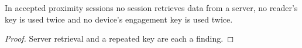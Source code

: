\begin{theorem}
  \label{thm:proximity-sessions}
  In accepted proximity sessions no session retrieves data from a server, no
  reader's key is used twice and no device's engagement key is used twice.
\end{theorem}
\begin{proof}
  Server retrieval and a repeated key are each a finding.
\end{proof}
